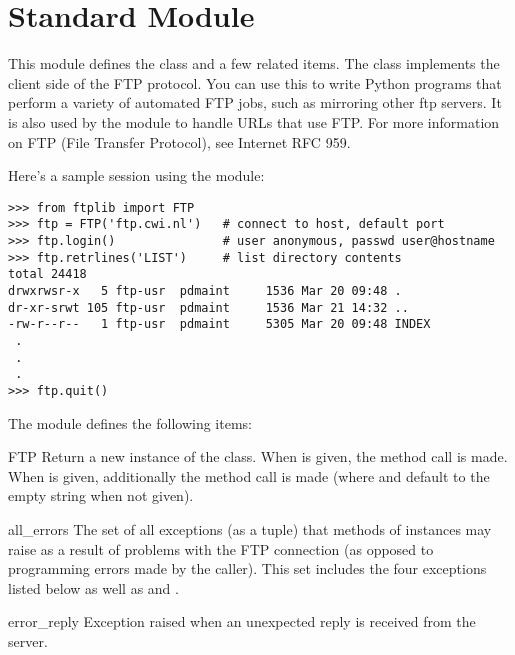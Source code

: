 \section{Standard Module }
\label{module-ftplib}

\renewcommand{\indexsubitem}{(in module ftplib)}

This module defines the class  and a few related items.  The
 class implements the client side of the FTP protocol.  You
can use this to write Python programs that perform a variety of
automated FTP jobs, such as mirroring other ftp servers.  It is also
used by the module  to handle URLs that use FTP.  For
more information on FTP (File Transfer Protocol), see Internet RFC
959.

Here's a sample session using the  module:

\bcode\begin{verbatim}
>>> from ftplib import FTP
>>> ftp = FTP('ftp.cwi.nl')   # connect to host, default port
>>> ftp.login()               # user anonymous, passwd user@hostname
>>> ftp.retrlines('LIST')     # list directory contents
total 24418
drwxrwsr-x   5 ftp-usr  pdmaint     1536 Mar 20 09:48 .
dr-xr-srwt 105 ftp-usr  pdmaint     1536 Mar 21 14:32 ..
-rw-r--r--   1 ftp-usr  pdmaint     5305 Mar 20 09:48 INDEX
 .
 .
 .
>>> ftp.quit()
\end{verbatim}\ecode
%
The module defines the following items:

\begin{funcdesc}{FTP}{}
Return a new instance of the  class.  When
 is given, the method call  is
made.  When  is given, additionally the method call
 is made (where
 and  default to the empty string when not given).
\end{funcdesc}

\begin{datadesc}{all_errors}
The set of all exceptions (as a tuple) that methods of 
instances may raise as a result of problems with the FTP connection
(as opposed to programming errors made by the caller).  This set
includes the four exceptions listed below as well as
 and .
\end{datadesc}

\begin{excdesc}{error_reply}
Exception raised when an unexpected reply is received from the server.
\end{excdesc}

